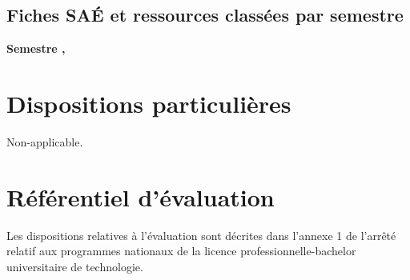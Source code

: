 \documentclass[10pt]{article}
\begin{document}
\subsection{Fiches SAÉ et ressources classées par semestre}
\textbf{Semestre , }\\
\par
\section{Dispositions particulières}
Non-applicable.
\section{Référentiel d’évaluation}
Les dispositions relatives à l’évaluation sont décrites dans l’annexe 1
de l’arrêté relatif aux programmes nationaux de la licence
professionnelle-bachelor universitaire de technologie.
\end{document}
